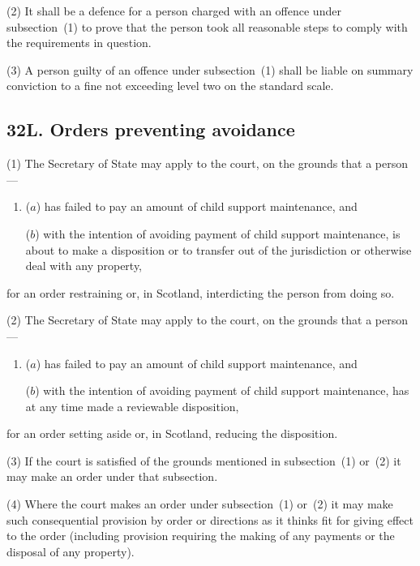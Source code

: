 \documentclass[12pt,a4paper]{article}
\begin{document}
(2)
It shall be a defence for a person charged with an offence under subsection~(1) to prove that the person took all reasonable steps to comply with the requirements in question.

(3)
A person guilty of an offence under subsection~(1) shall be liable on summary 
conviction to a fine not exceeding level two on the standard scale.


\subsection{32L. Orders preventing avoidance}

(1) The 
Secretary of State  %
may apply to the court, on the grounds that a person---
\begin{enumerate}\item[]
($a$) has failed to pay an amount of child support maintenance, and

($b$) with the intention of avoiding payment of child support maintenance, is about to make a disposition or to transfer out of the jurisdiction or otherwise deal with any property,
\end{enumerate}
for an order restraining or, in Scotland, interdicting the person from doing so.

(2) The 
Secretary of State  %
may apply to the court, on the grounds that a person---
\begin{enumerate}\item[]
($a$) has failed to pay an amount of child support maintenance, and

($b$) with the intention of avoiding payment of child support maintenance, has at any time made a reviewable disposition,
\end{enumerate}
for an order setting aside or, in Scotland, reducing the disposition.

(3)
If the court is satisfied of the grounds mentioned in subsection~(1) or~(2) it may make an order under that subsection.

(4)
Where the court makes an order under subsection~(1) or~(2) it may make such consequential provision by order or directions as it thinks fit for giving effect to the order (including provision requiring the making of any payments or the disposal of any property).
\end{document}
